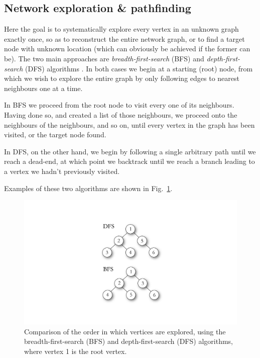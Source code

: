 \documentclass[aps, rmp, twocolumn, amsmath, amssymb, nofootinbib, superscriptaddress, longbibliography, floatfix, table-of-contents, eqsecnum]{revtex4-1}
\renewcommand{\tablename}{ALG.}
\begin{document}
\renewcommand{\tablename}{ALG.}

%
%

\subsection{Network exploration \& pathfinding} \label{sec:path_exp} 

Here the goal is to systematically explore every vertex in an unknown graph exactly once, so as to reconstruct the entire network graph, or to find a target node with unknown location (which can obviously be achieved if the former can be). The two main approaches are \textit{breadth-first-search} (BFS) and \textit{depth-first-search} (DFS) algorithms . In both cases we begin at a starting (root) node, from which we wish to explore the entire graph by only following edges to nearest neighbours one at a time.

In BFS we proceed from the root node to visit every one of its neighbours. Having done so, and created a list of those neighbours, we proceed onto the neighbours of the neighbours, and so on, until every vertex in the graph has been visited, or the target node found.

In DFS, on the other hand, we begin by following a single arbitrary path until we reach a dead-end, at which point we backtrack until we reach a branch leading to a vertex we hadn't previously visited.

Examples of these two algorithms are shown in Fig.~\ref{fig:BFS_DFS}.

\begin{figure}[!htb]
\includegraphics[width=0.6\columnwidth]{BFS_DFS}
\caption{Comparison of the order in which vertices are explored, using the breadth-first-search (BFS) and depth-first-search (DFS) algorithms, where vertex 1 is the root vertex.} \label{fig:BFS_DFS}
\end{figure}
\end{document}
